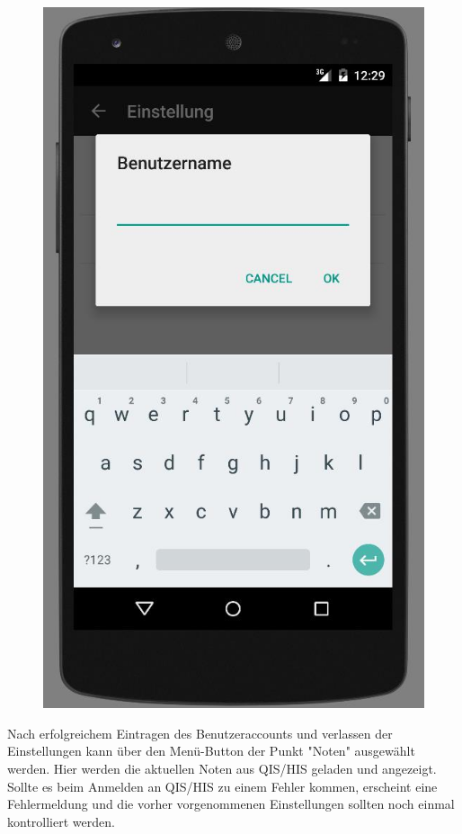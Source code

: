 \begin{figure}[htb]
    \begin{minipage}{0.45\linewidth}
        \centering
        \includegraphics[scale=0.5]{03_Bedienungsanleitung/img/account.jpg}
    \end{minipage}
\end{figure}

\newpage

Nach erfolgreichem Eintragen des Benutzeraccounts und verlassen der Einstellungen kann über den Menü-Button der Punkt "Noten" ausgewählt werden. Hier werden die aktuellen Noten aus QIS/HIS geladen und angezeigt. Sollte es beim Anmelden an QIS/HIS zu einem Fehler kommen, erscheint eine Fehlermeldung und die vorher vorgenommenen Einstellungen sollten noch einmal kontrolliert werden. 

